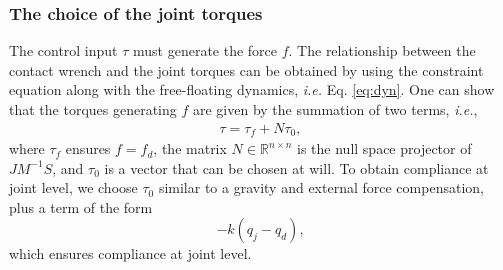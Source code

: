 \documentclass[final,5p,twocolumn]{elsarticle}
\newcommand{\mat}[1]{\ensuremath{\begin{bmatrix}#1\end{bmatrix}}}	%
\begin{document}

\subsubsection{The choice of the joint torques}
The control input $\tau$ must generate the force $f$. The relationship between the contact wrench and the joint torques can be obtained by using the constraint equation along with the free-floating dynamics, \textit{i.e.} Eq. \eqref{eq:dyn}.
One can show that the torques generating $f$ are given by the summation of two terms, \textit{i.e.},
\begin{eqnarray}
        \label{tau}
        \tau = \tau_f + N \tau_0,
\end{eqnarray}
where $\tau_f $ ensures $f = f_d$, the matrix $N \in \mathbb{R}^{n\times n}$ is the null space projector of 
$JM^{-1}S$,
and $\tau_0$ is a vector that can be chosen at will. To obtain compliance at joint level, we choose $\tau_0$ similar to 
a gravity and external force compensation, plus a term of the form \[ -k(q_j - q_d),\]
which ensures  compliance at joint level.
\end{document}
